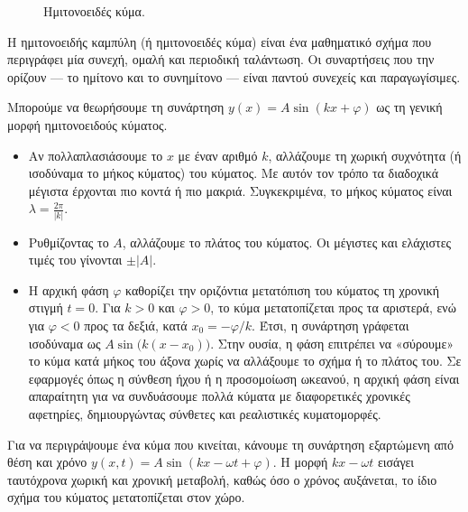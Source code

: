 \begin{figure}\vspace*{-.5\baselineskip}
    \centering
{}
\caption{Ημιτονοειδές κύμα.}
\label{fig:sinx}
\end{figure}
Η ημιτονοειδής καμπύλη (ή ημιτονοειδές κύμα) είναι ένα μαθηματικό σχήμα
που περιγράφει μία συνεχή, ομαλή και περιοδική ταλάντωση. Οι συναρτήσεις
που την ορίζουν --- το ημίτονο και το συνημίτονο --- είναι παντού
συνεχείς και παραγωγίσιμες.



Μπορούμε να θεωρήσουμε τη συνάρτηση \(y(x)=A\sin(kx+\varphi)\) ως τη
γενική μορφή ημιτονοειδούς κύματος.

\begin{itemize}
\item
  Αν πολλαπλασιάσουμε το \(x\) με έναν αριθμό \(k\), αλλάζουμε τη χωρική
  συχνότητα (ή ισοδύναμα το μήκος κύματος) του κύματος. Με αυτόν τον
  τρόπο τα διαδοχικά μέγιστα έρχονται πιο κοντά ή πιο μακριά.
  Συγκεκριμένα, το μήκος κύματος είναι \(\lambda=\frac{2\pi}{|k|}\).
\item
  Ρυθμίζοντας το \(A\), αλλάζουμε το πλάτος του κύματος. Οι μέγιστες και
  ελάχιστες τιμές του γίνονται \(\pm|A|\).
\item
  Η αρχική φάση \(\varphi\) καθορίζει την οριζόντια μετατόπιση του
  κύματος τη χρονική στιγμή \(t=0\). Για \(k>0\) και \(\varphi>0\), το
  κύμα μετατοπίζεται προς τα αριστερά, ενώ για \(\varphi<0\) προς τα
  δεξιά, κατά \(x_0=-\varphi/k\). Έτσι, η συνάρτηση γράφεται ισοδύναμα
  ως \(A\sin\bigl(k(x-x_0)\bigr)\). Στην ουσία, η φάση επιτρέπει να
  «σύρουμε» το κύμα κατά μήκος του άξονα χωρίς να αλλάξουμε το σχήμα ή
  το πλάτος του. Σε εφαρμογές όπως η σύνθεση ήχου ή η προσομοίωση
  ωκεανού, η αρχική φάση είναι απαραίτητη για να συνδυάσουμε πολλά
  κύματα με διαφορετικές χρονικές αφετηρίες, δημιουργώντας σύνθετες και
  ρεαλιστικές κυματομορφές.
\end{itemize}

Για να περιγράψουμε ένα κύμα που κινείται, κάνουμε τη συνάρτηση
εξαρτώμενη από θέση και χρόνο \(y(x,t)=A\sin(kx-\omega t + \varphi)\). Η
μορφή \(kx-\omega t\) εισάγει ταυτόχρονα χωρική και χρονική μεταβολή,
καθώς όσο ο χρόνος αυξάνεται, το ίδιο σχήμα του κύματος μετατοπίζεται
στον χώρο.

